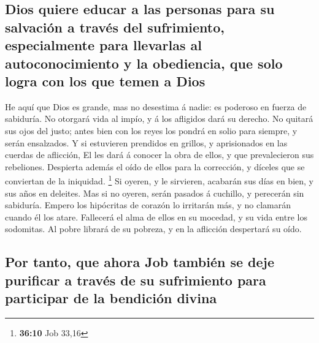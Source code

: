 \hypertarget{dios-quiere-educar-a-las-personas-para-su-salvaciuxf3n-a-travuxe9s-del-sufrimiento-especialmente-para-llevarlas-al-autoconocimiento-y-la-obediencia-que-solo-logra-con-los-que-temen-a-dios}{%
\subsection{Dios quiere educar a las personas para su salvación a través
del sufrimiento, especialmente para llevarlas al autoconocimiento y la
obediencia, que solo logra con los que temen a
Dios}\label{dios-quiere-educar-a-las-personas-para-su-salvaciuxf3n-a-travuxe9s-del-sufrimiento-especialmente-para-llevarlas-al-autoconocimiento-y-la-obediencia-que-solo-logra-con-los-que-temen-a-dios}}

 He aquí que Dios es grande, mas no desestima á nadie: es
poderoso en fuerza de sabiduría.  No otorgará vida al
impío, y á los afligidos dará su derecho.  No quitará sus
ojos del justo; antes bien con los reyes los pondrá en solio para
siempre, y serán ensalzados.  Y si estuvieren prendidos en
grillos, y aprisionados en las cuerdas de aflicción,  El
les dará á conocer la obra de ellos, y que prevalecieron sus rebeliones.
 Despierta además el oído de ellos para la corrección, y
díceles que se conviertan de la iniquidad. \footnote{\textbf{36:10} Job
  33,16}  Si oyeren, y le sirvieren, acabarán sus días en
bien, y sus años en deleites.  Mas si no oyeren, serán
pasados á cuchillo, y perecerán sin sabiduría.  Empero
los hipócritas de corazón lo irritarán más, y no clamarán cuando él los
atare.  Fallecerá el alma de ellos en su mocedad, y su
vida entre los sodomitas.  Al pobre librará de su
pobreza, y en la aflicción despertará su oído.

\hypertarget{por-tanto-que-ahora-job-tambiuxe9n-se-deje-purificar-a-travuxe9s-de-su-sufrimiento-para-participar-de-la-bendiciuxf3n-divina}{%
\subsection{Por tanto, que ahora Job también se deje purificar a través
de su sufrimiento para participar de la bendición
divina}\label{por-tanto-que-ahora-job-tambiuxe9n-se-deje-purificar-a-travuxe9s-de-su-sufrimiento-para-participar-de-la-bendiciuxf3n-divina}}

